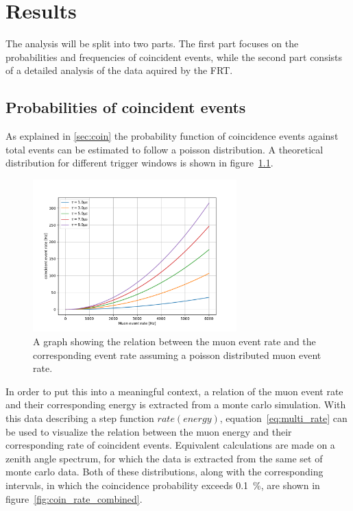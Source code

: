 \chapter{Results}

The analysis will be split into two parts. The first part focuses on the probabilities and frequencies of coincident events, while the second part 
consists of a detailed analysis of the data aquired by the FRT. 

\section{Probabilities of coincident events}\label{sec:muon_coincidence}

As explained in \ref{sec:coin} the probability function of coincidence events against total events can be estimated to follow a poisson distribution.
A theoretical distribution for different trigger windows is shown in figure~\ref{fig:coin_rate_rate}. 

\begin{figure}
    \centering
    \includegraphics[width=0.7\textwidth]{Plots/coincidence_rate_poisson.pdf}
    \caption{A graph showing the relation between the muon event rate and the corresponding event rate assuming a poisson distributed muon event rate.}
    \label{fig:coin_rate_rate}
\end{figure}

In order to put this into a meaningful context, a relation of the muon event rate and their corresponding energy is extracted from a monte carlo simulation.
With this data describing a step function $rate(energy)$, equation~\ref{eq:multi_rate} can be used to visualize the relation between the muon energy and their 
corresponding rate of coincident events. Equivalent calculations are made on a zenith angle spectrum, for which the data is extracted from the same set of monte 
carlo data. Both of these distributions, along with the corresponding intervals, in which the coincidence probability exceeds \SI{0.1}{\percent}, are shown in 
figure~\ref{fig:coin_rate_combined}.

